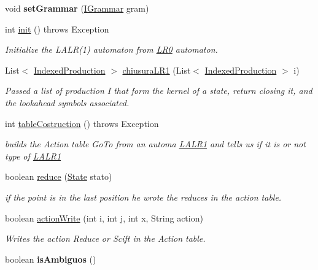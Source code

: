 \begin{DoxyCompactItemize}
\item 
\hypertarget{classcontext_free_1_1parser_1_1_l_a_l_r1_a66f5fb1ac9aab089d3fa937acf3f63ce}{void {\bfseries set\-Grammar} (\hyperlink{interfacecontext_free_1_1grammar_1_1_i_grammar}{I\-Grammar} gram)}\label{classcontext_free_1_1parser_1_1_l_a_l_r1_a66f5fb1ac9aab089d3fa937acf3f63ce}

\item 
int \hyperlink{classcontext_free_1_1parser_1_1_l_a_l_r1_a7618cff4af4edfffb9a538a7cb1e79cf}{init} ()  throws Exception
\begin{DoxyCompactList}\small\item\em Initialize the L\-A\-L\-R(1) automaton from \hyperlink{classcontext_free_1_1parser_1_1_l_r0}{L\-R0} automaton. \end{DoxyCompactList}\item 
List$<$ \hyperlink{classcontext_free_1_1parser_1_1_indexed_production}{Indexed\-Production} $>$ \hyperlink{classcontext_free_1_1parser_1_1_l_a_l_r1_ac711dbbc2be25d15c1a8aade7579e94e}{chiusura\-L\-R1} (List$<$ \hyperlink{classcontext_free_1_1parser_1_1_indexed_production}{Indexed\-Production} $>$ i)
\begin{DoxyCompactList}\small\item\em Passed a list of production I that form the kernel of a state, return closing it, and the lookahead symbols associated. \end{DoxyCompactList}\item 
int \hyperlink{classcontext_free_1_1parser_1_1_l_a_l_r1_a79576626b3b59b832faecc986b293b36}{table\-Costruction} ()  throws Exception
\begin{DoxyCompactList}\small\item\em builds the Action table Go\-To from an automa \hyperlink{classcontext_free_1_1parser_1_1_l_a_l_r1}{L\-A\-L\-R1} and tells us if it is or not type of \hyperlink{classcontext_free_1_1parser_1_1_l_a_l_r1}{L\-A\-L\-R1} \end{DoxyCompactList}\item 
boolean \hyperlink{classcontext_free_1_1parser_1_1_l_a_l_r1_a2281981b3043c0150c1b3d3967572b1f}{reduce} (\hyperlink{classcontext_free_1_1parser_1_1_state}{State} stato)
\begin{DoxyCompactList}\small\item\em if the point is in the last position he wrote the reduces in the action table. \end{DoxyCompactList}\item 
boolean \hyperlink{classcontext_free_1_1parser_1_1_l_a_l_r1_a7379103379c94e377daca0022b28771e}{action\-Write} (int i, int j, int x, String action)
\begin{DoxyCompactList}\small\item\em Writes the action Reduce or Scift in the Action table. \end{DoxyCompactList}\item 
\hypertarget{classcontext_free_1_1parser_1_1_l_a_l_r1_a9c19be71fc16e04343eb3c23b6eac9da}{boolean {\bfseries is\-Ambiguos} ()}\label{classcontext_free_1_1parser_1_1_l_a_l_r1_a9c19be71fc16e04343eb3c23b6eac9da}


\end{DoxyCompactItemize}
